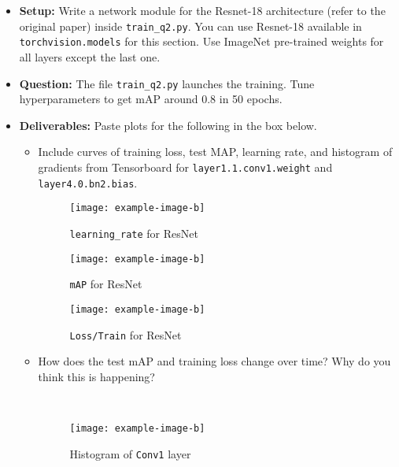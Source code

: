 \documentclass[11pt,addpoints,answers]{exam}
\numberwithin{equation}{section} %
\numberwithin{figure}{section} %
\numberwithin{table}{section} %
\begin{document}
\begin{itemize}
    \item \textbf{Setup:} Write a network module for the Resnet-18 architecture (refer to the original paper) inside \texttt{train\_q2.py}. You can use Resnet-18 available in \texttt{torchvision.models} for this section. Use ImageNet pre-trained weights for all layers except the last one. 
    \item \textbf{Question:} The file \texttt{train\_q2.py} launches the training. Tune hyperparameters to get mAP around 0.8 in 50 epochs.
    \item \textbf{Deliverables:} Paste plots for the following in the box below.
    \begin{itemize}
        \item Include curves of training loss, test MAP, learning rate, and histogram of gradients from Tensorboard for \texttt{layer1.1.conv1.weight} and \texttt{layer4.0.bn2.bias}. 
        
        \begin{figure}[H]
        \centering
        \texttt{[image: example-image-b]}
        \caption{\texttt{learning\_rate} for ResNet}
        \label{fig:q2_learning_rate}
        \end{figure}
        
        \begin{figure}[H]
        \centering
        \texttt{[image: example-image-b]}
        \caption{\texttt{mAP} for ResNet}
        \label{fig:q2_map}
        \end{figure}
        
        \begin{figure}[H]
        \centering
        \texttt{[image: example-image-b]}
        \caption{\texttt{Loss/Train} for ResNet}
        \label{fig:q2_training_loss}
        \end{figure}

        \item How does the test mAP and training loss change over time? Why do you think this is happening?

        \begin{solution}
        \\
        \end{solution}
        
        \begin{figure}[H]
        \centering
        \texttt{[image: example-image-b]}
        \caption{Histogram of \texttt{Conv1} layer}
        \label{fig:q2_histogram_conv1}
        \end{figure}
        

\end{itemize}
\end{itemize}
\end{document}
